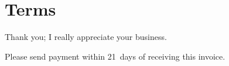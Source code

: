 \documentclass[a4paper]{article}
\begin{document}
\section*{Terms}
\label{sec:orgheadline5}

Thank you; I really appreciate your business.

Please send payment within 21~days of receiving this invoice.

\vfill
\end{document}
